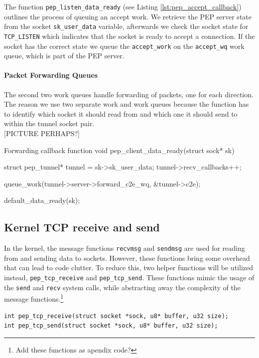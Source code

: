 \documentclass[a4paper,english, 11pt]{report}
\begin{document}
The function \verb|pep_listen_data_ready| (see Listing \ref{lst:pep_accept_callback}) outlines the process of queuing an accept work. We retrieve the PEP server state from the socket \verb|sk_user_data| variable, afterwards we check the socket state for \verb|TCP_LISTEN| which indicates that the socket is ready to accept a connection. If the socket has the correct state we queue the \verb|accept_work| on the \verb|accept_wq| work queue, which is part of the PEP server.

\paragraph{Packet Forwarding Queues}\label{sec:forward_queues}
The second two work queues handle forwarding of packets, one for each direction. The reason we use two separate work and work queues because the function has to identify which socket it should read from and which one it should send to within the tunnel socket pair. \\

[PICTURE PERHAPS?]

\begin{autonumlstlisting}[label=lst:pep_forward_callback]{Forwarding callback function}
void pep_client_data_ready(struct sock* sk)
{
	struct pep_tunnel* tunnel = sk->sk_user_data;
	tunnel->recv_callbacks++;
        
	queue_work(tunnel->server->forward_c2e_wq, &tunnel->c2e);
        
	default_data_ready(sk);
}
\end{autonumlstlisting}

\subsection{Kernel TCP receive and send}
In the kernel, the message functions \verb|recvmsg| and \verb|sendmsg| are used for reading from and sending data to sockets. However, these functions bring some overhead that can lead to code clutter. To reduce this, two helper functions will be utilized instead, \verb|pep_tcp_receive| and \verb|pep_tcp_send|. These functions mimic the usage of the \verb|send| and \verb|recv| system calls, while abstracting away the complexity of the message functions.\footnote{Add these functions as apendix code?}

\begin{verbatim}
int pep_tcp_receive(struct socket *sock, u8* buffer, u32 size);
int pep_tcp_send(struct socket *sock, u8* buffer, u32 size);
\end{verbatim}
\end{document}
